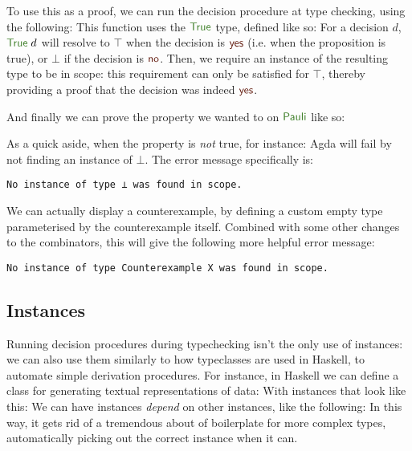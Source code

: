 \begin{refsection}
To use this as a proof, we can run the decision procedure at type checking,
using the following:
This function uses the \(\AgdaDatatype{True}\) type, defined like so:
For a decision \(d\), \(\AgdaDatatype{True}\; d\) will resolve to \(\top\) when
the decision is \(\AgdaInductiveConstructor{yes}\) (i.e. when the proposition is
true), or \(\bot\) if the decision is \(\AgdaInductiveConstructor{no}\).
Then, we require an instance of the resulting type to be in scope: this
requirement can only be satisfied for \(\top\), thereby providing a proof that
the decision was indeed \(\AgdaInductiveConstructor{yes}\).

And finally we can prove the property we wanted to on \(\AgdaDatatype{Pauli}\)
like so:

As a quick aside, when the property is \emph{not} true, for instance:
Agda will fail by not finding an instance of \(\bot\).
The error message specifically is:
\begin{displayquote}
  \verb+No instance of type ⊥ was found in scope.+
\end{displayquote}
We can actually display a counterexample, by defining a custom empty type
parameterised by the counterexample itself.
Combined with some other changes to the combinators, this will give the
following more helpful error message:
\begin{displayquote}
  \verb+No instance of type Counterexample X was found in scope.+
\end{displayquote}
\subsection{Instances}
Running decision procedures during typechecking isn't the only use of instances:
we can also use them similarly to how typeclasses are used in Haskell, to
automate simple derivation procedures.
For instance, in Haskell we can define a class for generating textual
representations of data:
With instances that look like this:
We can have instances \emph{depend} on other instances, like the following:
In this way, it gets rid of a tremendous about of boilerplate for more complex
types, automatically picking out the correct instance when it can.


\end{refsection}
